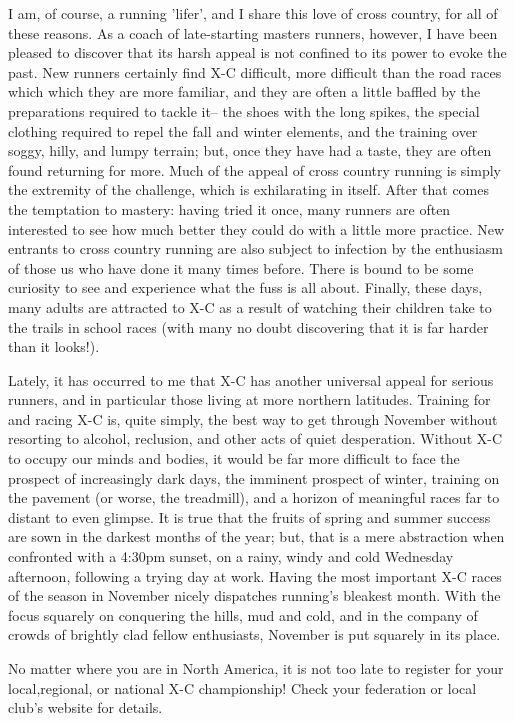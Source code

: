I am, of course, a running 'lifer', and I share this love of cross country, for all of these reasons. As a coach of late-starting masters runners, however, I have been pleased to discover that its harsh appeal is not confined to its power to evoke the past. New runners certainly find X-C difficult, more difficult than the road races which which they are more familiar, and they are often a little baffled by the preparations required to tackle it-- the shoes with the long spikes, the special clothing required to repel the fall and winter elements, and the training over soggy, hilly, and lumpy terrain; but, once they have had a taste, they are often found returning for more. Much of the appeal of cross country running is simply the extremity of the challenge, which is exhilarating in itself. After that comes the temptation to mastery: having tried it once, many runners are often interested to see how much better they could do with a little more practice. New entrants to cross country running are also subject to infection by the enthusiasm of those us who have done it many times before. There is bound to be some curiosity to see and experience what the fuss is all about. Finally, these days, many adults are attracted to X-C as a result of watching their children take to the trails in school races (with many no doubt discovering that it is far harder than it looks!).

Lately, it has occurred to me that X-C has another universal appeal for serious runners, and in particular those living at more northern latitudes. Training for and racing X-C is, quite simply, the best way to get through November without resorting to alcohol, reclusion, and other acts of quiet desperation. Without X-C to occupy our minds and bodies, it would be far more difficult to face the prospect of increasingly dark days, the imminent prospect of winter, training on the pavement (or worse, the treadmill), and a horizon of meaningful races far to distant to even glimpse. It is true that the fruits of spring and summer success are sown in the darkest months of the year; but, that is a mere abstraction when confronted with a 4:30pm sunset, on a rainy, windy and cold Wednesday afternoon, following a trying day at work. Having the most important X-C races of the season in November nicely dispatches running's bleakest month. With the focus squarely on conquering the hills, mud and cold, and in the company of crowds of brightly clad fellow enthusiasts, November is put squarely in its place.

No matter where you are in North America, it is not too late to register for your local,regional, or national X-C championship! Check your federation or local club's website for details.

